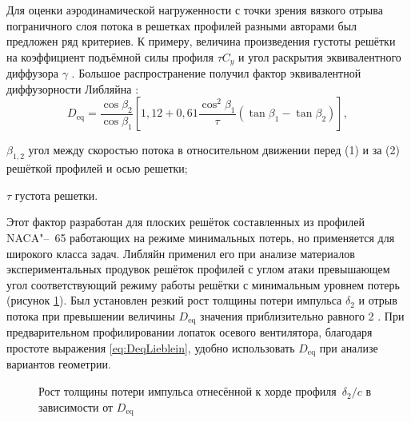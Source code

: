Для оценки аэродинамической нагруженности с точки зрения вязкого отрыва пограничного слоя потока в решетках профилей разными авторами был предложен ряд критериев. К примеру, величина произведения густоты решётки на коэффициент подъёмной силы профиля $\tau C_y$ \cite{Hausenblas1963,Dovjik1968} и угол раскрытия эквивалентного диффузора \(\gamma\) \cite{Dovjik1958,Uschakov1963}. Большое распространение получил фактор эквивалентной диффузорности Либляйна \cite{Lieblein1959}:
\begin{equation}
	D_\text{eq} = \frac{\cos \beta_2}{\cos \beta_1} \left[ 1,12 + 0,61\frac{\cos^2\beta_1}{\tau}(\tan \beta_1 - \tan\beta_2) \right],
	\label{eq:DeqLieblein}
\end{equation}
\begin{eqexpl}
	\item{$\beta_{1,2}$} угол между скоростью потока в относительном движении перед (1) и за (2) решёткой профилей и осью решетки;
	\item{$\tau$} густота решетки.
\end{eqexpl}

Этот фактор разработан для плоских решёток составленных из профилей NACA"--~65 работающих на режиме минимальных потерь, но применяется для широкого класса задач. Либляйн применил его при анализе материалов экспериментальных продувок решёток профилей с углом атаки превышающем угол соответствующий режиму работы решётки с минимальным уровнем потерь (рисунок \ref{fig:DeqLieblein}). Был установлен резкий рост толщины потери импульса $\delta_2$ и отрыв потока при превышении величины $D_\text{eq}$ значения приблизительно равного 2 \cite{Lieblein1959}. При предварительном профилировании лопаток осевого вентилятора, благодаря простоте выражения \ref{eq:DeqLieblein}, удобно использовать $D_\text{eq}$ при анализе вариантов геометрии.
\begin{figure}[ht]
	\caption{Рост толщины потери импульса отнесённой к хорде профиля~$\delta_2/c$ в зависимости от $D_\text{eq}$ \cite{Lieblein1959}}
	\label{fig:DeqLieblein}
\end{figure}

